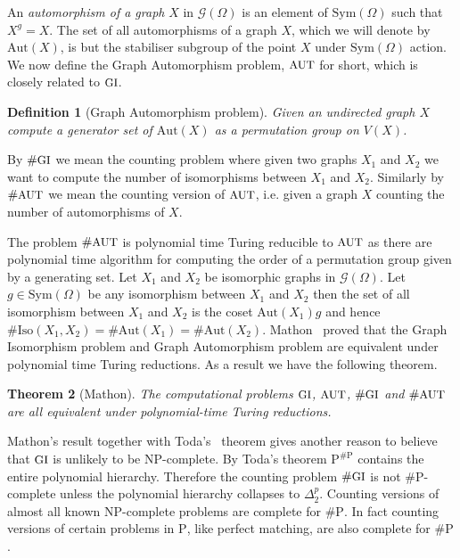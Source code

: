 \documentclass[11pt]{madras}%
\newtheorem{theorem}{Theorem}[chapter]
\newtheorem{definition}[theorem]{Definition}
\theoremstyle{remark}
\newcommand{\Aut}[1]{{\ensuremath{\mathrm{Aut}\left(#1\right)}}}
\newcommand{\Sym}[1]{{\ensuremath{\mathrm{Sym}\left(#1\right)}}}
\newcommand{\ProblemFont}[1]{{\ensuremath{\textrm{\small #1}}}}
\begin{document}
An \emph{automorphism of a graph} $X$
in $\mathcal{G}(\Omega)$ is an element of $\Sym{\Omega}$ such that
$X^g = X$. The set of all automorphisms of a graph $X$, which we will
denote by $\Aut{X}$, is but the stabiliser subgroup of the point $X$
under $\Sym{\Omega}$ action. We now define the Graph Automorphism
problem, $\ProblemFont{AUT}$ for short, which is closely related to
$\ProblemFont{GI}$.

\begin{definition}[Graph Automorphism problem] Given an undirected
  graph $X$ compute a generator set of $\Aut{X}$ as a permutation
  group on $V(X)$.
\end{definition}

By $\# \ProblemFont{GI}$ we mean the counting problem where given two
graphs $X_1$ and $X_2$ we want to compute the number of isomorphisms
between $X_1$ and $X_2$. Similarly by $\# \ProblemFont{AUT}$ we mean
the counting version of $\ProblemFont{AUT}$, i.e. given a graph $X$
counting the number of automorphisms of $X$. 

The problem $\# \ProblemFont{AUT}$ is polynomial time Turing reducible
to $\ProblemFont{AUT}$ as there are polynomial time algorithm for
computing the order of a permutation group given by a generating set.
Let $X_1$ and $X_2$ be isomorphic graphs in $\mathcal{G}(\Omega)$.
Let $g \in \Sym{\Omega}$ be any isomorphism between $X_1$ and $X_2$
then the set of all isomorphism between $X_1$ and $X_2$ is the coset
$\Aut{X_1}g$ and hence $\#\mathrm{Iso}(X_1,X_2) = \# \Aut{X_1} = \#
\Aut{X_2}$. Mathon~\cite{mathon79note} proved that the Graph
Isomorphism problem and Graph Automorphism problem are equivalent
under polynomial time Turing reductions. As a result we have the
following theorem.

\begin{theorem}[Mathon]\label{thm-mathon}
  The computational problems $\ProblemFont{GI}$, $\ProblemFont{AUT}$,
  $\# \ProblemFont{GI}$ and $\# \ProblemFont{AUT}$ are all equivalent
  under polynomial-time Turing reductions.
\end{theorem}

Mathon's result together with Toda's~\cite{toda91pp} theorem gives
another reason to believe that $\ProblemFont{GI}$ is unlikely to be
$\mathrm{NP}$-complete. By Toda's theorem $\mathrm{P}^{\# \mathrm{P}}$
contains the entire polynomial hierarchy. Therefore the counting
problem $\# \ProblemFont{GI}$ is not $\# \mathrm{P}$-complete unless
the polynomial hierarchy collapses to $\Delta_2^p$.  Counting versions
of almost all known $\mathrm{NP}$-complete problems are complete for
$\# \mathrm{P}$.  In fact counting versions of certain problems in
$\mathrm{P}$, like perfect matching, are also complete for $\#
\mathrm{P}$.
\end{document}

